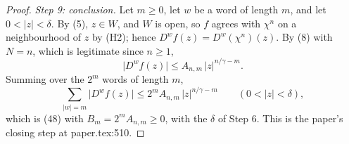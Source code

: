 \begin{proof}
\emph{Step 9: conclusion.}  Let $m\ge0$, let $w$ be a word of length $m$, and
let $0<|z|<\delta$.  By (5), $z\in W$, and $W$ is open, so $f$ agrees with
$\chi^{n}$ on a neighbourhood of $z$ by (H2); hence
$D^{w}f(z)=D^{w}(\chi^{n})(z)$.  By (8) with $N=n$, which is legitimate since
$n\ge1$,
\[
  \bigl|D^{w}f(z)\bigr|\le A_{n,m}\,|z|^{n/\gamma-m}.
\]
Summing over the $2^{m}$ words of length $m$,
\[
  \sum_{|w|=m}\bigl|D^{w}f(z)\bigr|\le 2^{m}A_{n,m}\,|z|^{n/\gamma-m}
  \qquad(0<|z|<\delta),
\]
which is (48) with $B_m=2^{m}A_{n,m}\ge0$, with the $\delta$ of Step 6.  This
is the paper's closing step at paper.tex:510.
\end{proof}
